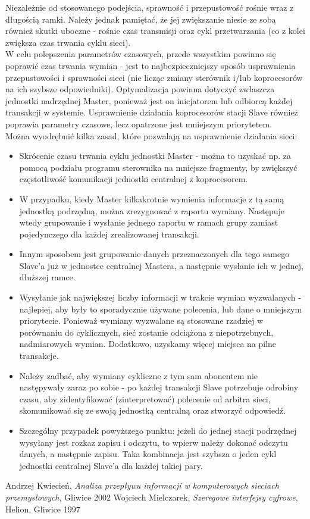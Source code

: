 \documentclass[a4paper,twoside]{article}
\begin{document}
	Niezależnie od stosowanego podejścia, sprawność i przepustowość rośnie wraz z długością ramki. Należy jednak pamiętać, że jej zwiększanie niesie ze sobą również skutki uboczne - rośnie czas transmisji oraz cykl przetwarzania (co z kolei zwiększa czas trwania cyklu sieci). \\
	W celu polepszenia parametrów czasowych, przede wszystkim powinno się poprawić czas trwania wymian - jest to najbezpieczniejszy sposób usprawnienia przepustowości i sprawności sieci (nie licząc zmiany sterównik i/lub koprocesorów na ich szybsze odpowiedniki). Optymalizacja powinna dotyczyć zwłaszcza jednostki nadrzędnej Master, ponieważ jest on inicjatorem lub odbiorcą każdej transakcji w systemie. Usprawnienie działania koprocesorów stacji Slave również poprawia parametry czasowe, lecz opatrzone jest mniejszym priorytetem. \\
	Można wyodrębnić kilka zasad, które pozwalają na usprawnienie działania sieci:
	\begin{itemize}
		\item Skrócenie czasu trwania cyklu jednostki Master - można to uzyskać np. za pomocą podziału programu sterownika na mniejsze fragmenty, by zwiększyć częstotliwość komunikacji jednostki centralnej z koprocesorem.
		\item W przypadku, kiedy Master kilkakrotnie wymienia informacje z tą samą jednostką podrzędną, można zrezygnować z raportu wymiany. Następuje wtedy grupowanie i wysłanie jednego raportu w ramach grupy zamiast pojedynczego dla każdej zrealizowanej transakcji.
		\item Innym sposobem jest grupowanie danych przeznaczonych dla tego samego Slave'a już w jednostce centralnej Mastera, a następnie wysłanie ich w jednej, dłuższej ramce.
		\item Wysyłanie jak największej liczby informacji w trakcie wymian wyzwalanych - najlepiej, aby były to sporadycznie używane polecenia, lub dane o mniejszym priorytecie. Ponieważ wymiany wyzwalane są stosowane rzadziej w porównaniu do cyklicznych, sieć zostanie odciążona z niepotrzebnych, nadmiarowych wymian. Dodatkowo, uzyskamy więcej miejsca na pilne transakcje.
		\item Należy zadbać, aby wymiany cykliczne z tym sam abonentem nie następywały zaraz po sobie - po każdej transakcji Slave potrzebuje odrobiny czasu, aby zidentyfikować (zinterpretować) polecenie od arbitra sieci, skomunikować się ze swoją jednostką centralną oraz stworzyć odpowiedź.
		\item Szczególny przypadek powyższego punktu: jeżeli do jednej stacji podrzędnej wysyłany jest rozkaz zapisu i odczytu, to wpierw należy dokonać odczytu danych, a następnie zapisu. Taka kombinacja jest szybsza o jeden cykl jednostki centralnej Slave'a dla każdej takiej pary.
	\end{itemize}


\newpage
\begin{thebibliography}{2}
	 Andrzej Kwiecień, \textit{Analiza przepływu informacji w komputerowych sieciach przemysłowych}, Gliwice 2002
	 Wojciech Mielczarek, \textit{Szeregowe interfejsy cyfrowe}, Helion, Gliwice 1997
\end{thebibliography}
\end{document}
